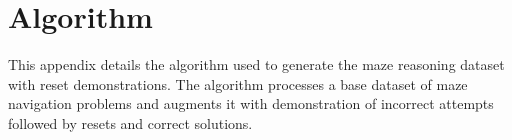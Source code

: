 \appendix

\section{Algorithm}
This appendix details the algorithm used to generate the maze reasoning dataset with reset demonstrations. The algorithm processes a base dataset of maze navigation problems and augments it with demonstration of incorrect attempts followed by resets and correct solutions.






